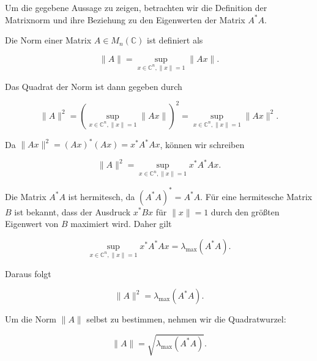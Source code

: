 Um die gegebene Aussage zu zeigen, betrachten wir die Definition der Matrixnorm und ihre Beziehung zu den Eigenwerten der Matrix \(A^* A\).

Die Norm einer Matrix \( A \in M_n(\mathbb{C}) \) ist definiert als

\[
\|A\| = \sup_{x \in \mathbb{C}^n, \|x\| = 1} \|Ax\|.
\]

Das Quadrat der Norm ist dann gegeben durch

\[
\|A\|^2 = \left( \sup_{x \in \mathbb{C}^n, \|x\| = 1} \|Ax\| \right)^2 = \sup_{x \in \mathbb{C}^n, \|x\| = 1} \|Ax\|^2.
\]

Da \(\|Ax\|^2 = (Ax)^* (Ax) = x^* A^* A x\), können wir schreiben

\[
\|A\|^2 = \sup_{x \in \mathbb{C}^n, \|x\| = 1} x^* A^* A x.
\]

Die Matrix \(A^* A\) ist hermitesch, da \((A^* A)^* = A^* A\). Für eine hermitesche Matrix \(B\) ist bekannt, dass der Ausdruck \(x^* B x\) für \(\|x\| = 1\) durch den größten Eigenwert von \(B\) maximiert wird. Daher gilt

\[
\sup_{x \in \mathbb{C}^n, \|x\| = 1} x^* A^* A x = \lambda_{\max}(A^* A).
\]

Daraus folgt

\[
\|A\|^2 = \lambda_{\max}(A^* A).
\]

Um die Norm \(\|A\|\) selbst zu bestimmen, nehmen wir die Quadratwurzel:

\[
\|A\| = \sqrt{\lambda_{\max}(A^* A)}.
\]

